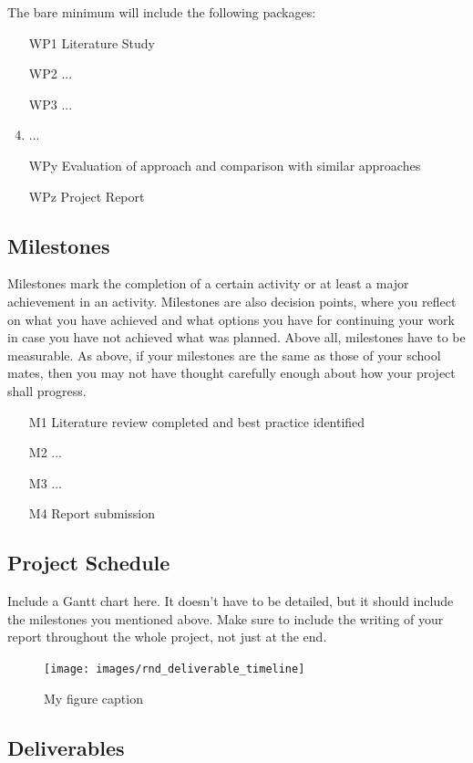 \documentclass[thesis]{mas_proposal}
\begin{document}
The bare minimum will include the following packages:
\begin{enumerate}
    \item[WP1] Literature Study
    \item[WP2] ...
    \item[WP3] ...
    \item  ...
    \item[WPy] Evaluation of approach and comparison with similar approaches
    \item[WPz] Project Report
\end{enumerate}

\subsection{Milestones}
Milestones mark the completion of a certain activity or at least a major achievement in an activity. Milestones are also decision points, where you reflect on what you have achieved and what options you have for continuing your work in case you have not achieved what was planned. Above all, milestones have to be measurable. As above, if your milestones are the same as those of your school mates, then you may not have thought carefully enough about how your project shall progress.
\begin{enumerate}
    \item[M1] Literature review completed and best practice identified
    \item[M2] ...
    \item[M3] ...
    \item[M4] Report submission
\end{enumerate}

\subsection{Project Schedule}
Include a Gantt chart here. It doesn't have to be detailed, but it should include the milestones you mentioned above.
Make sure to include the writing of your report throughout the whole project, not just at the end.

\begin{figure}[h!]
    \texttt{[image: images/rnd\_deliverable\_timeline]}
    \caption{My figure caption}
    \label{fig:myfigure}
\end{figure}

\subsection{Deliverables}
\end{document}
